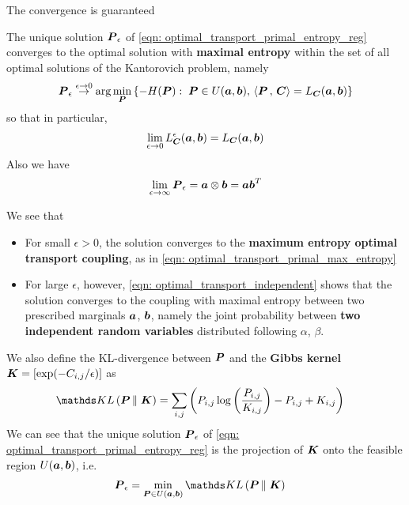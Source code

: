 \documentclass[11pt]{article}
\begin{document}
The convergence is guaranteed 
\begin{proposition}
The unique solution $\boldsymbol{P}_{\epsilon}$ of \eqref{eqn: optimal_transport_primal_entropy_reg} converges to the optimal solution with \textbf{maximal entropy} within the set of all optimal solutions of the Kantorovich problem, namely
\begin{align}
\boldsymbol{P}_{\epsilon} \stackrel{\epsilon\rightarrow 0}{\rightarrow} \arg\min_{\boldsymbol{P}}\left\{-H(\boldsymbol{P}): \;\boldsymbol{P} \in U(\boldsymbol{a}, \boldsymbol{b}),\,  \left\langle \boldsymbol{P}\,,\, \boldsymbol{C} \right\rangle = L_{\boldsymbol{C}}(\boldsymbol{a}, \boldsymbol{b})\right\}  \label{eqn: optimal_transport_primal_max_entropy}
\end{align}
so that in particular, 
\begin{align}
\lim_{\epsilon\rightarrow 0} L_{\boldsymbol{C}}^{\epsilon}(\boldsymbol{a}, \boldsymbol{b}) =  L_{\boldsymbol{C}}(\boldsymbol{a}, \boldsymbol{b})  \nonumber
\end{align}
Also we have 
\begin{align}
\lim_{\epsilon\rightarrow \infty}\boldsymbol{P}_{\epsilon} = \boldsymbol{a} \otimes \boldsymbol{b} = \boldsymbol{a}\boldsymbol{b}^{T}  \label{eqn: optimal_transport_independent}
\end{align}
\end{proposition}
We see that 
\begin{itemize}
\item For small $\epsilon >0$, the solution converges to the \textbf{maximum entropy optimal transport coupling}, as in \eqref{eqn: optimal_transport_primal_max_entropy}

\item For large $\epsilon$, however, \eqref{eqn: optimal_transport_independent} shows that the solution converges to the coupling with maximal entropy between two prescribed marginals $\boldsymbol{a}$, $\boldsymbol{b}$, namely the joint probability between \textbf{two independent random variables} distributed following $\alpha$, $\beta$. 
\end{itemize}

We also define the KL-divergence between $\boldsymbol{P}$ and the \textbf{Gibbs kernel} $\boldsymbol{K} = [\exp(-C_{i,j} / \epsilon)]$ as
\begin{align}
\kl{\mb{P}}{\mb{K}} &= \sum_{i,j}\paren{P_{i,j}\log\paren{\frac{P_{i,j}}{K_{i,j}}} - P_{i,j} + K_{i,j}}
\end{align} We can see that the unique solution $\boldsymbol{P}_{\epsilon}$ of \eqref{eqn: optimal_transport_primal_entropy_reg} is the projection of $\boldsymbol{K}$ onto the feasible region $U(\boldsymbol{a}, \boldsymbol{b})$, i.e.
\begin{align}
\mb{P}_{\epsilon} &= \min_{\mb{P} \in U(\mb{a}, \mb{b})}\kl{\mb{P}}{\mb{K}} \label{eqn: optimal_transport_primal_kl}
\end{align}
\end{document}

